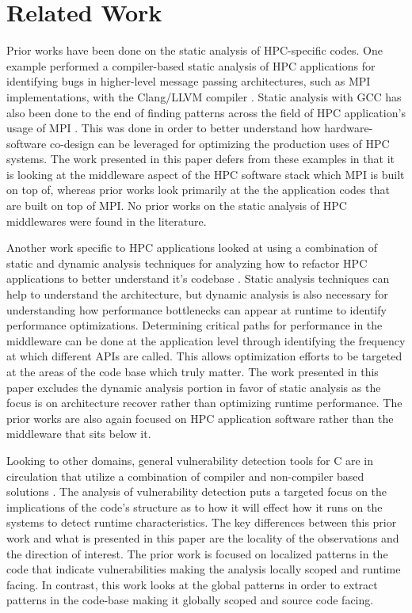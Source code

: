 \section{Related Work}
\label{sec:related}

Prior works have been done on the static analysis of HPC-specific codes. One example performed a compiler-based static analysis of HPC applications for identifying bugs in higher-level message passing architectures, such as MPI implementations, with the Clang/LLVM compiler \cite{sca_thesis}. Static analysis with GCC has also been done to the end of finding patterns across the field of HPC application's usage of MPI \cite{10.1007/978-3-030-17872-7_6}. This was done in order to better understand how hardware-software co-design can be leveraged for optimizing the production uses of HPC systems. The work presented in this paper defers from these examples in that it is looking at the middleware aspect of the HPC software stack which MPI is built on top of, whereas prior works look primarily at the the application codes that are built on top of MPI. No prior works on the static analysis of HPC middlewares were found in the literature.

Another work specific to HPC applications looked at using a combination of static and dynamic analysis techniques for analyzing how to refactor HPC applications to better understand it's codebase \cite{9460653}. Static analysis techniques can help to understand the architecture, but dynamic analysis is also necessary for understanding how performance bottlenecks can appear at runtime to identify performance optimizations. Determining critical paths for performance in the middleware can be done at the application level through identifying the frequency at which different APIs are called. This allows optimization efforts to be targeted at the areas of the code base which truly matter. The work presented in this paper excludes the dynamic analysis portion in favor of static analysis as the focus is on architecture recover rather than optimizing runtime performance. The prior works are also again focused on HPC application software rather than the middleware that sits below it.

Looking to other domains, general vulnerability detection tools for C are in circulation that utilize a combination of compiler and non-compiler based solutions \cite{vulnerability_detection_in_c}. The analysis of vulnerability detection puts a targeted focus on the implications of the code's structure as to how it will effect how it runs on the systems to detect runtime characteristics. The key differences between this prior work and what is presented in this paper are the locality of the observations and the direction of interest. The prior work is focused on localized patterns in the code that indicate vulnerabilities making the analysis locally scoped and runtime facing. In contrast, this work looks at the global patterns in order to extract patterns in the code-base making it globally scoped and source code facing.

